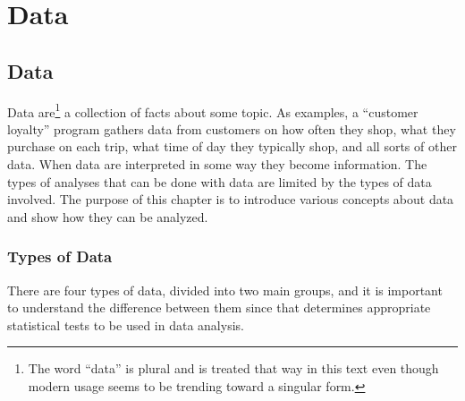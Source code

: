 \chapter{Data}\label{06:data}


\section{Data}\label{intro:TypesOfData}

Data are\footnote{The word ``data'' is plural and is treated that way in this text even though modern usage seems to be trending toward a singular form.} a collection of facts about some topic. As examples, a ``customer loyalty'' program gathers data from customers on how often they shop, what they purchase on each trip, what time of day they typically shop, and all sorts of other data. When data are interpreted in some way they become information. The types of analyses that can be done with data are limited by the types of data involved. The purpose of this chapter is to introduce various concepts about data and show how they can be analyzed.

\subsection{Types of Data}

There are four types of data, divided into two main groups, and it is important to understand the difference between them since that determines appropriate statistical tests to be used in data analysis.

